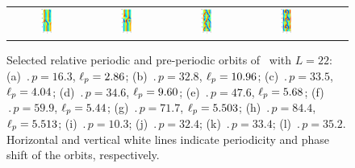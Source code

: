 \begin{figure}[t]
\begin{center}
\begin{tabular}{cccccc}
\includegraphics[width=0.15\textwidth, clip=true]{figs/ks22rpo059.9-05.44.eps}\hspace{-3ex} &
\includegraphics[width=0.15\textwidth, clip=true]{figs/ks22rpo084.4-05.51.eps}\hspace{-3ex} &
\includegraphics[width=0.15\textwidth, clip=true]{figs/ks22rpo064.7-00.00.eps}\hspace{-3ex} &
\includegraphics[width=0.15\textwidth, clip=true]{figs/ks22rpo070.3-00.00.eps}
\end{tabular}
\end{center}
\caption{Selected relative periodic and
pre-periodic
orbits of \KSe\ with $L = 22$:
(a) $\period{p} = 16.3$, $\ell_p = 2.86$;
(b) $\period{p} = 32.8$, $\ell_p = 10.96$;
(c) $\period{p} = 33.5$, $\ell_p = 4.04$;
(d) $\period{p} = 34.6$, $\ell_p = 9.60$;
(e) $\period{p} = 47.6$, $\ell_p = 5.68$;
(f) $\period{p} = 59.9$, $\ell_p = 5.44$;
(g) $\period{p} = 71.7$, $\ell_p = 5.503$;
(h) $\period{p} = 84.4$, $\ell_p = 5.513$;
(i) $\period{p} = 10.3$;
(j) $\period{p} = 32.4$;
(k) $\period{p} = 33.4$;
(l) $\period{p} = 35.2$.
Horizontal and vertical white lines indicate periodicity and phase
shift of the orbits, respectively.
}\label{f:ks22rpos}
\end{figure}
